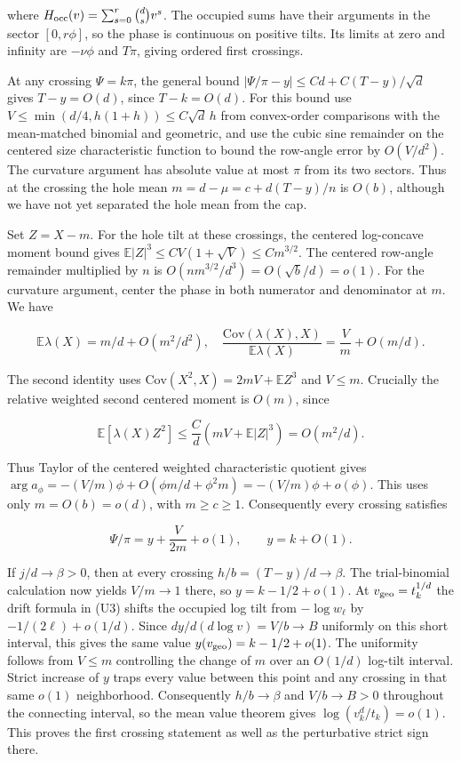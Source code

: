 where $H_{\rm occ}(v)=\sum_{s=0}^r\binom ds v^s$. The occupied sums have their arguments in the sector $[0,r\phi]$, so the phase is continuous on positive tilts. Its limits at zero and infinity are $-\nu\phi$ and $T\pi$, giving ordered first crossings.

At any crossing $\Psi=k\pi$, the general bound $|\Psi/\pi-y|\le Cd+C(T-y)/\sqrt d$ gives $T-y=O(d)$, since $T-k=O(d)$. For this bound use $V\le\min(d/4,h(1+h))\le C\sqrt d\,h$ from convex-order comparisons with the mean-matched binomial and geometric, and use the cubic sine remainder on the centered size characteristic function to bound the row-angle error by $O(V/d^2)$. The curvature argument has absolute value at most $\pi$ from its two sectors. Thus at the crossing the hole mean $m=d-\mu=c+d(T-y)/n$ is $O(b)$, although we have not yet separated the hole mean from the cap.

Set $Z=X-m$. For the hole tilt at these crossings, the centered log-concave moment bound gives $\mathbb E|Z|^3\le CV(1+\sqrt V)\le Cm^{3/2}$. The centered row-angle remainder multiplied by $n$ is $O(nm^{3/2}/d^3)=O(\sqrt b/d)=o(1)$. For the curvature argument, center the phase in both numerator and denominator at $m$. We have

\begin{equation*}
\mathbb E\lambda(X)=m/d+O(m^2/d^2),\quad
\frac{\mathrm{Cov}(\lambda(X),X)}{\mathbb E\lambda(X)}
=\frac Vm+O(m/d).
\end{equation*}

The second identity uses $\mathrm{Cov}(X^2,X)=2mV+\mathbb E Z^3$ and $V\le m$. Crucially the relative weighted second centered moment is $O(m)$, since

\begin{equation*}
\mathbb E[\lambda(X)Z^2]\le \frac{C}{d}\left(mV+\mathbb E|Z|^3\right)
=O(m^2/d).
\end{equation*}

Thus Taylor of the centered weighted characteristic quotient gives $\arg a_\phi=-(V/m)\phi+O(\phi m/d+\phi^2m)=-(V/m)\phi+o(\phi)$. This uses only $m=O(b)=o(d)$, with $m\ge c\ge1$. Consequently every crossing satisfies

\begin{equation*}
\Psi/\pi=y+\frac{V}{2m}+o(1),\qquad y=k+O(1).
\end{equation*}

If $j/d\to\beta>0$, then at every crossing $h/b=(T-y)/d\to\beta$. The trial-binomial calculation now yields $V/m\to1$ there, so $y=k-1/2+o(1)$. At $v_{\rm geo}=t_k^{1/d}$ the drift formula in (U3) shifts the occupied log tilt from $-\log w_\ell$ by $-1/(2\ell)+o(1/d)$. Since $dy/d(d\log v)=V/b\to B$ uniformly on this short interval, this gives the same value $y(v_{\rm geo})=k-1/2+o(1)$. The uniformity follows from $V\le m$ controlling the change of $m$ over an $O(1/d)$ log-tilt interval. Strict increase of $y$ traps every value between this point and any crossing in that same $o(1)$ neighborhood. Consequently $h/b\to\beta$ and $V/b\to B>0$ throughout the connecting interval, so the mean value theorem gives $\log(v_k^d/t_k)=o(1)$. This proves the first crossing statement as well as the perturbative strict sign there.


